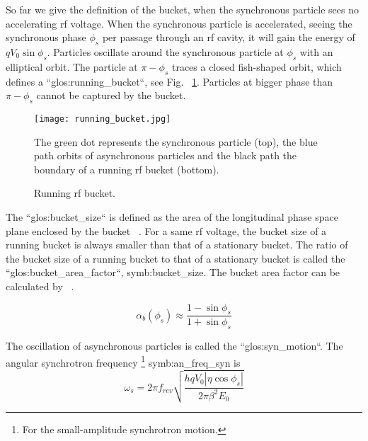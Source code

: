 
So far we give the definition of the bucket, when the synchronous particle sees no accelerating rf voltage. When the synchronous particle is accelerated, seeing the synchronous phase $\phi_{\mathit{s}}$ per passage through an rf cavity, it will gain the energy of $qV_0\sin\phi_{\mathit{s}}$. %
Particles oscillate around the synchronous particle at $\phi_{\mathit{s}}$ with an elliptical orbit. The particle at $\pi-\phi_{\mathit{s}}$ traces a closed fish-shaped orbit, which defines a ``\gls{glos:running_bucket}``, see Fig. ~\ref{running_bucket}. Particles at bigger phase than $\pi-\phi_{\mathit{s}}$ cannot be captured by the bucket.
\begin{figure}[!htb]
   \centering   
   \texttt{[image: running\_bucket.jpg]}
   \caption{Running rf bucket.}{The green dot represents the synchronous particle (top), the blue path orbits of asynchronous particles and the black path the boundary of a running rf bucket (bottom).}
   \label{running_bucket}
\end{figure} 

The ``\gls{glos:bucket_size}`` is defined as the area of the longitudinal phase space plane enclosed by the bucket ~\cite{lee_accelerator_2011}. For a same rf voltage, the bucket size of a running bucket is always smaller than that of a stationary bucket. The ratio of the bucket size of a running bucket to that of a stationary bucket is called the ``\gls{glos:bucket_area_factor}``, \gls{symb:bucket_size}. The bucket area factor can be calculated by ~\cite{lee_accelerator_2011}.

\begin{equation}
\alpha_b(\phi_{s})\approx \frac{1-\sin\phi_{s}}{1+\sin\phi_{s}}
\label{eq:buckt_area_factor}
\end{equation} 

The oscillation of asynchronous particles is called the ``\gls{glos:syn_motion}``. The angular synchrotron frequency \footnote{For the small-amplitude synchrotron motion.} \gls{symb:an_freq_syn} is ~\cite{lee_accelerator_2011}
\begin{equation}
\omega_{s}=2\pi f_{\mathit{rev}}\sqrt{\frac{hqV_0|\eta\cos\phi_{s}|}{2\pi\beta^2E_0}}
\label{eq:synchfreq}
\end{equation} 

